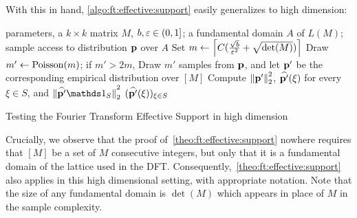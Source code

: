 With this in hand, \cref{algo:ft:effective:support} easily generalizes to high dimension:
\begin{algorithm}
  \begin{algorithmic}[1]
    \Require parameters, a $k \times k$ matrix $M$, $b,\varepsilon\in(0,1]$; a fundamental domain $A$ of $L(M)$; sample access to distribution $\mathbf{p}$ over $A$
    \State\label{algo:ft:pmd:step:choosemprime} Set $m\gets \left\lceil C(\frac{\sqrt{b}}{\varepsilon^2}+ \sqrt{\det(M)}) \right\rceil$ 
    \State Draw $m'\gets \operatorname{Poisson}\!\left( m \right) $; if $m'>2m$, \Return \reject
    \State\label{algo:ft:pmd:step:empr} Draw $m'$ samples from $\mathbf{p}$, and let $\mathbf{p}'$ be the corresponding empirical distribution over $[M]$
    \State\label{algo:ft:pmd:step:norm} Compute ${\lVert\mathbf{p}'{\rVert}}_2^2$, $\widehat{\mathbf{p}'}(\xi)$ for every $\xi\in S$, and $\normtwo{\fourier{\q'}\indicSet{S}}^2$ 
    \label{algo:ft:pmd:step:norm:check} \Return \reject
     \Return \reject
    \Else
      \State \Return $(\widehat{\mathbf{p}'}(\xi))_{\xi\in S}$
    \EndIf
  \end{algorithmic}
  \caption{Testing the Fourier Transform Effective Support in high dimension}\label{algo:ft:pmd:effective:support:high-dim}
\end{algorithm}

Crucially, we observe that the proof of~\cref{theo:ft:effective:support} nowhere requires that $[M]$ be a set of $M$ consecutive integers, but only that it is a fundamental domain of the lattice used in the DFT. Consequently,~\cref{theo:ft:effective:support} also applies in this high dimensional setting, with appropriate notation. Note that the size of any fundamental domain is $\det(M)$ which appears in place of $M$ in the sample complexity.

